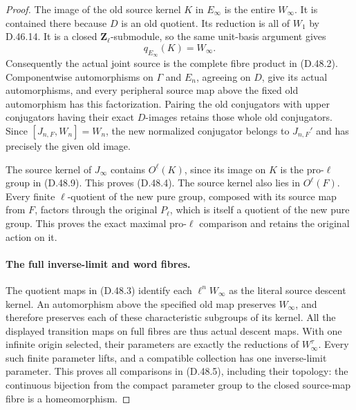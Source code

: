 \begin{proof}
The image of the old source kernel \(K\)
in \(E_\infty\) is the entire
\(W_\infty\). It is contained there
because \(D\) is an old quotient.
Its reduction is all of \(W_1\) by
D.46.14. It is a closed
\(\mathbf Z_\ell\)-submodule, so the
same unit-basis argument gives
\[
 q_{E_\infty}(K)=W_\infty.
 \tag{D.48.9}
\]
Consequently the actual joint source
is the complete fibre product in
\textup{(D.48.2)}. Componentwise
automorphisms on \(\Gamma\) and
\(E_n\), agreeing on \(D\), give
its actual automorphisms, and every
peripheral source map above the fixed
old automorphism has this factorization.
Pairing the old conjugators with upper
conjugators having their exact
\(D\)-images retains those whole old
conjugators. Since \([J_{n,F},W_n]=W_n\),
the new normalized conjugator belongs
to \(J_{n,F}'\) and has precisely the
given old image.

The source kernel of \(J_\infty\)
contains \(O^\ell(K)\), since its
image on \(K\) is the pro-\(\ell\)
group in \textup{(D.48.9)}.
This proves \textup{(D.48.4)}.
The source kernel also lies in
\(O^\ell(F)\). Every finite
\(\ell\)-quotient of the new pure
group, composed with its source map
from \(F\), factors through the
original \(P_\ell\), which is itself
a quotient of the new pure group.
This proves the exact maximal
pro-\(\ell\) comparison and retains
the original action on it.

\paragraph{The full inverse-limit and word fibres.}
The quotient maps in
\textup{(D.48.3)} identify each
\(\ell^nW_\infty\) as the literal
source descent kernel. An automorphism
above the specified old map preserves
\(W_\infty\), and therefore preserves
each of these characteristic subgroups
of its kernel. All the displayed
transition maps on full fibres are
thus actual descent maps.
With one infinite origin selected,
their parameters are exactly the
reductions of \(W_\infty^\tau\).
Every such finite parameter lifts,
and a compatible collection has
one inverse-limit parameter.
This proves all comparisons in
\textup{(D.48.5)}, including their
topology: the continuous bijection
from the compact parameter group
to the closed source-map fibre is
a homeomorphism.


\end{proof}
